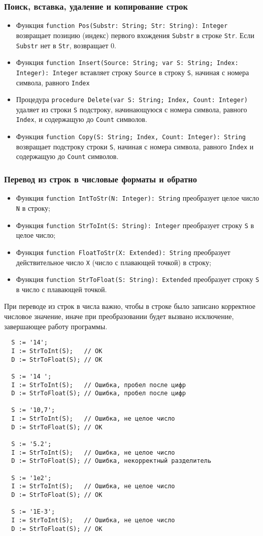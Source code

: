 \documentclass[12pt,a4paper]{report}
\begin{document}
\subsubsection*{Поиск, вставка, удаление и копирование строк}
\begin{itemize}
\item Функция \texttt{function Pos(Substr: String; Str: String): Integer} возвращает позицию (индекс) первого вхождения \texttt{Substr} в строке \texttt{Str}. Если \texttt{Substr} нет в \texttt{Str}, возвращает 0.
\item Функция \texttt{function Insert(Source: String; var S: String; Index: Integer): Integer} вставляет строку \texttt{Source} в строку \texttt{S}, начиная с номера символа, равного \texttt{Index}
\item Процедура \texttt{procedure Delete(var S: String; Index, Count: Integer)} удаляет из строки \texttt{S} подстроку, начинающуюся с номера символа, равного \texttt{Index}, и содержащую до \texttt{Count} символов.
\item Функция \texttt{function Copy(S: String; Index, Count: Integer): String} возвращает подстроку строки \texttt{S}, начиная с номера символа, равного \texttt{Index} и содержащую до \texttt{Count} символов.
\end{itemize}
\subsubsection*{Перевод из строк в числовые форматы и обратно}
\begin{itemize}
\item Функция \texttt{function IntToStr(N: Integer): String} преобразует целое число \texttt{N} в строку;
\item Функция \texttt{function StrToInt(S: String): Integer} преобразует строку \texttt{S} в целое число;
\item Функция \texttt{function FloatToStr(X: Extended): String} преобразует действительное число \texttt{X} (число с плавающей точкой) в строку;
\item Функция \texttt{function StrToFloat(S: String): Extended} преобразует строку \texttt{S} в число с плавающей точкой.
\end{itemize}
При переводе из строк в числа важно, чтобы в строке было записано корректное числовое значение, иначе при преобразовании будет вызвано исключение, завершающее работу программы.
\begin{verbatim}
  S := '14';
  I := StrToInt(S);   // OK
  D := StrToFloat(S); // OK

  S := '14 ';
  I := StrToInt(S);   // Ошибка, пробел после цифр
  D := StrToFloat(S); // Ошибка, пробел после цифр

  S := '10,7';
  I := StrToInt(S);   // Ошибка, не целое число
  D := StrToFloat(S); // OK

  S := '5.2';
  I := StrToInt(S);   // Ошибка, не целое число
  D := StrToFloat(S); // Ошибка, некорректный разделитель

  S := '1e2';
  I := StrToInt(S);   // Ошибка, не целое число
  D := StrToFloat(S); // OK

  S := '1E-3';
  I := StrToInt(S);   // Ошибка, не целое число
  D := StrToFloat(S); // OK
\end{verbatim}
\end{document}
